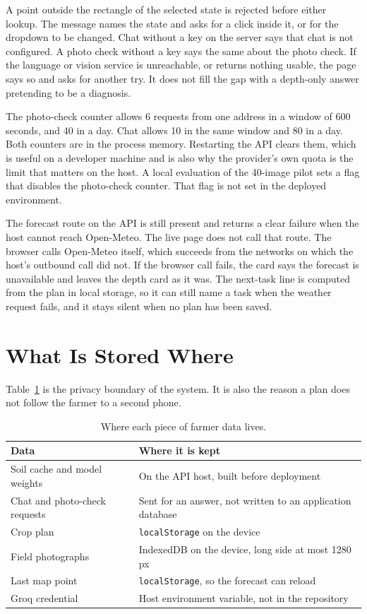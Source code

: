 A point outside the rectangle of the selected state is rejected before either lookup. The message names the state and asks for a click inside it, or for the dropdown to be changed. Chat without a key on the server says that chat is not configured. A photo check without a key says the same about the photo check. If the language or vision service is unreachable, or returns nothing usable, the page says so and asks for another try. It does not fill the gap with a depth-only answer pretending to be a diagnosis.

The photo-check counter allows 6 requests from one address in a window of 600 seconds, and 40 in a day. Chat allows 10 in the same window and 80 in a day. Both counters are in the process memory. Restarting the API clears them, which is useful on a developer machine and is also why the provider's own quota is the limit that matters on the host. A local evaluation of the 40-image pilot sets a flag that disables the photo-check counter. That flag is not set in the deployed environment.

The forecast route on the API is still present and returns a clear failure when the host cannot reach Open-Meteo. The live page does not call that route. The browser calls Open-Meteo itself, which succeeds from the networks on which the host's outbound call did not. If the browser call fails, the card says the forecast is unavailable and leaves the depth card as it was. The next-task line is computed from the plan in local storage, so it can still name a task when the weather request fails, and it stays silent when no plan has been saved.

\section{What Is Stored Where}
Table~\ref{tab:storage} is the privacy boundary of the system. It is also the reason a plan does not follow the farmer to a second phone.

\begin{table}[H]
\centering
\caption{Where each piece of farmer data lives.}
\label{tab:storage}
\small
\begin{tabularx}{\textwidth}{lX}
\toprule
\textbf{Data} & \textbf{Where it is kept} \\
\midrule
Soil cache and model weights & On the API host, built before deployment \\
Chat and photo-check requests & Sent for an answer, not written to an application database \\
Crop plan & \texttt{localStorage} on the device \\
Field photographs & IndexedDB on the device, long side at most 1280\,px \\
Last map point & \texttt{localStorage}, so the forecast can reload \\
Groq credential & Host environment variable, not in the repository \\
\bottomrule
\end{tabularx}
\end{table}

